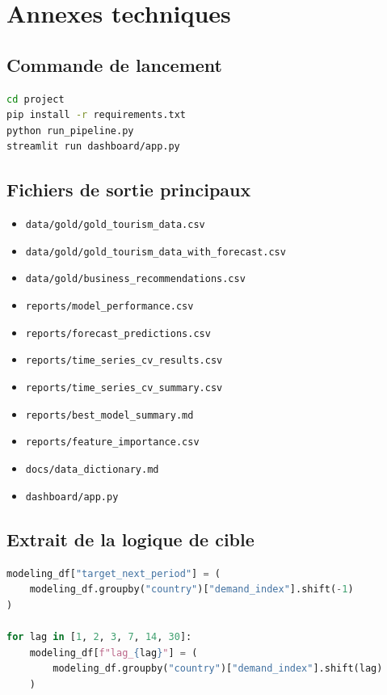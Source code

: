 \documentclass[11pt,a4paper]{report}
\begin{document}
\chapter{Annexes techniques}

\section{Commande de lancement}

\begin{lstlisting}[language=bash]
cd project
pip install -r requirements.txt
python run_pipeline.py
streamlit run dashboard/app.py
\end{lstlisting}

\section{Fichiers de sortie principaux}

\begin{itemize}[leftmargin=*]
    \item \texttt{data/gold/gold\_tourism\_data.csv}
    \item \texttt{data/gold/gold\_tourism\_data\_with\_forecast.csv}
    \item \texttt{data/gold/business\_recommendations.csv}
    \item \texttt{reports/model\_performance.csv}
    \item \texttt{reports/forecast\_predictions.csv}
    \item \texttt{reports/time\_series\_cv\_results.csv}
    \item \texttt{reports/time\_series\_cv\_summary.csv}
    \item \texttt{reports/best\_model\_summary.md}
    \item \texttt{reports/feature\_importance.csv}
    \item \texttt{docs/data\_dictionary.md}
    \item \texttt{dashboard/app.py}
\end{itemize}

\section{Extrait de la logique de cible}

\begin{lstlisting}[language=Python]
modeling_df["target_next_period"] = (
    modeling_df.groupby("country")["demand_index"].shift(-1)
)

for lag in [1, 2, 3, 7, 14, 30]:
    modeling_df[f"lag_{lag}"] = (
        modeling_df.groupby("country")["demand_index"].shift(lag)
    )
\end{lstlisting}
\end{document}
